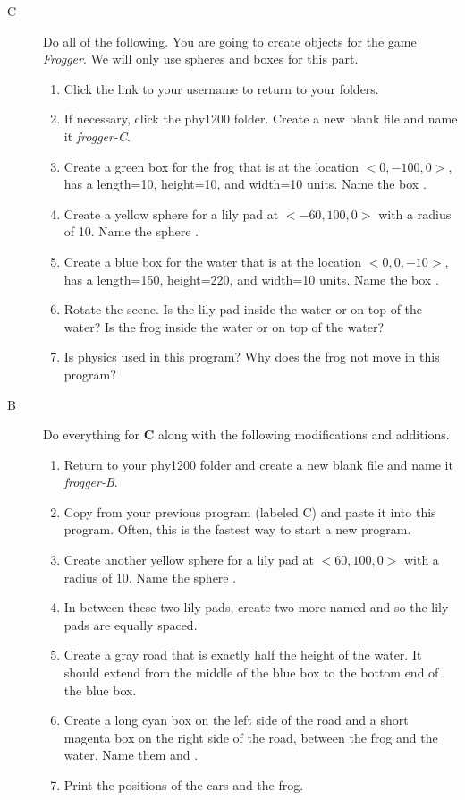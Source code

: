 \begin{description}

\item[C] Do all of the following.
You are going to create objects for the game \emph{Frogger}. We will only use spheres and boxes for this part.
\begin{enumerate}
	\item Click the link to your username to return to your folders.
	\item If necessary, click the phy1200 folder. Create a new blank file and name it \emph{frogger-C}. 
	\item Create a green box for the frog that is at the location $<0,-100,0>$, has a length=10, height=10, and width=10 units. Name the box .
	\item Create a yellow sphere for a lily pad at $<-60,100,0>$ with a radius of 10. Name the sphere .
	\item Create a blue box for the water that is at the location $<0,0,-10>$, has a length=150, height=220, and width=10 units. Name the box .
	\item Rotate the scene. Is the lily pad inside the water or on top of the water?  Is the frog inside the water or on top of the water?
	\item Is physics used in this program? Why does the frog not move in this program?
\end{enumerate}

\item[B] Do everything for {\bf C} along with the following modifications and additions.

\begin{enumerate}
	\item Return to your phy1200 folder and create a new blank file and name it \emph{frogger-B}. 
	\item Copy from your previous program (labeled C) and paste it into this program. Often, this is the fastest way to start a new program.
	\item Create another yellow sphere for a lily pad at $<60,100,0>$ with a radius of 10. Name the sphere .
	\item In between these two lily pads, create two more named   and   so the lily pads are equally spaced.
	\item Create a gray road that is exactly half the height of the water. It should extend from the middle of the blue box to the bottom end of the blue box.
	\item Create a long cyan box on the left side of the road and a short magenta box on the right side of the road, between the frog and the water. Name them  and .
	\item Print the positions of the cars and the frog.
\end{enumerate}


\end{description}
